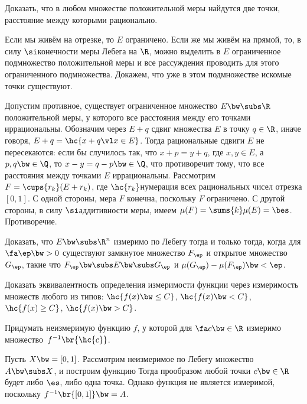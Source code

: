 \documentclass[a4paper]{article}
\begin{document}
\begin{problem}
  Доказать, что в любом множестве положительной меры найдутся две точки, расстояние между
  которыми рационально.
\end{problem}
\begin{solution}
  Если мы живём на отрезке, то $E$ ограничено. Если же мы живём на прямой, то, в
  силу $\si$\д конечности меры Лебега на $\R$, можно выделить в $E$ ограниченное
  подмножество положительной меры и все рассуждения проводить для этого ограниченного
  подмножества. Докажем, что уже в этом подмножестве искомые точки существуют.

  Допустим противное,  существует ограниченное множество $E \bw\subs \R$ положительной меры,
  у которого все расстояния между его точками иррациональны. Обозначим через $E + q$ сдвиг
  множества $E$ в точку $q \in \R$, иначе говоря, $E + q = \hc{x + q \vl x \in E}$. Тогда
  рациональные сдвиги $E$ не пересекаются: если бы случилось так, что $x + p = y + q$,
  где $x, y \in E$, а $p,q \bw\in \Q$, то $x-y = q-p \bw\in \Q$, что противоречит тому,
  что все расстояния между точками $E$ иррациональны. Рассмотрим $F = \cups{r_k} (E + r_k)$,
  где $\hc{r_k}$\т нумерация всех рациональных чисел отрезка $[0,1]$. С одной стороны,
  мера $F$ конечна, поскольку $F$ ограничено. С другой стороны, в силу $\si$\д аддитивности
  меры, имеем $\mu(F) = \sums{k} \mu(E) = \bes$. Противоречие.
\end{solution}

\begin{problem}
  Доказать, что $E \bw\subs \R^n$ измеримо по Лебегу тогда и только тогда, когда для
  $\fa \ep \bw> 0$ существуют замкнутое множество $F_\ep$ и открытое множество~$G_\ep$, такие что
  $F_\ep \bw\subs E \bw\subs G_\ep$ и $\mu(G_\ep)-\mu(F_\ep) \bw< \ep$.
\end{problem}

\begin{problem}
  Доказать эквивалентность определения измеримости функции через измеримость множеств любого из типов:
  $\hc{f(x) \bw\le C}$, $\hc{f(x) \bw< C}$, $\hc{f(x) \ge C}$, $\hc{f(x) \bw> C}$.
\end{problem}

\begin{problem}\label{unmes.f.with.mes.coim.of.every.point}
  Придумать неизмеримую функцию $f$, у которой для $\fa c \bw\in \R$ измеримо
  множество~$f^{-1}\br{\hc{c}}$.
\end{problem}
\begin{solution}
  Пусть $X \bw= [0,1]$. Рассмотрим неизмеримое по Лебегу множество $A \bw\subs X$, и построим
  функцию
  Тогда прообразом любой точки $c \bw\in \R$ будет либо $\es$, либо одна точка. Однако функция
  не является измеримой, поскольку $f^{-1}\br{[0,1]} \bw= A$.
\end{solution}
\end{document}

